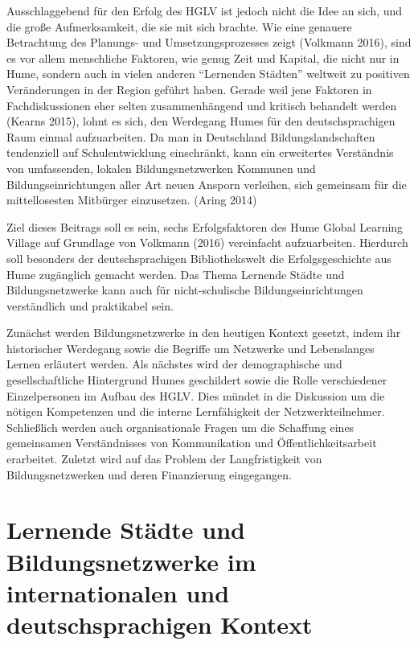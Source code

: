 \documentclass[a4paper,
fontsize=11pt,
oneside,
numbers=noperiodatend,
parskip=half-,
bibliography=totoc,
final
]{scrartcl}
\begin{document}
Ausschlaggebend für den Erfolg des HGLV ist jedoch nicht die Idee an
sich, und die große Aufmerksamkeit, die sie mit sich brachte. Wie eine
genauere Betrachtung des Planungs- und Umsetzungsprozesses zeigt
(Volkmann 2016), sind es vor allem menschliche Faktoren, wie genug Zeit
und Kapital, die nicht nur in Hume, sondern auch in vielen anderen
\enquote{Lernenden Städten} weltweit zu positiven Veränderungen in der
Region geführt haben. Gerade weil jene Faktoren in Fachdiskussionen eher
selten zusammenhängend und kritisch behandelt werden (Kearns 2015),
lohnt es sich, den Werdegang Humes für den deutschsprachigen Raum einmal
aufzuarbeiten. Da man in Deutschland Bildungslandschaften tendenziell
auf Schulentwicklung einschränkt, kann ein erweitertes Verständnis von
umfassenden, lokalen Bildungsnetzwerken Kommunen und
Bildungseinrichtungen aller Art neuen Ansporn verleihen, sich gemeinsam
für die mittellosesten Mitbürger einzusetzen. (Aring 2014)

Ziel dieses Beitrags soll es sein, sechs Erfolgsfaktoren des Hume Global
Learning Village auf Grundlage von Volkmann (2016) vereinfacht
aufzuarbeiten. Hierdurch soll besonders der deutschsprachigen
Bibliothekswelt die Erfolgsgeschichte aus Hume zugänglich gemacht
werden. Das Thema Lernende Städte und Bildungsnetzwerke kann auch für
nicht-schulische Bildungseinrichtungen verständlich und praktikabel
sein.

Zunächst werden Bildungsnetzwerke in den heutigen Kontext gesetzt, indem
ihr historischer Werdegang sowie die Begriffe um Netzwerke und
Lebenslanges Lernen erläutert werden. Als nächstes wird der
demographische und gesellschaftliche Hintergrund Humes geschildert sowie
die Rolle verschiedener Einzelpersonen im Aufbau des HGLV. Dies mündet
in die Diskussion um die nötigen Kompetenzen und die interne
Lernfähigkeit der Netzwerkteilnehmer. Schließlich werden auch
organisationale Fragen um die Schaffung eines gemeinsamen Verständnisses
von Kommunikation und Öffentlichkeitsarbeit erarbeitet. Zuletzt wird auf
das Problem der Langfristigkeit von Bildungsnetzwerken und deren
Finanzierung eingegangen.

\hypertarget{lernende-stuxe4dte-und-bildungsnetzwerke-im-internationalen-und-deutschsprachigen-kontext}{%
\section*{Lernende Städte und Bildungsnetzwerke im internationalen
und deutschsprachigen
Kontext}\label{lernende-stuxe4dte-und-bildungsnetzwerke-im-internationalen-und-deutschsprachigen-kontext}}
\end{document}

